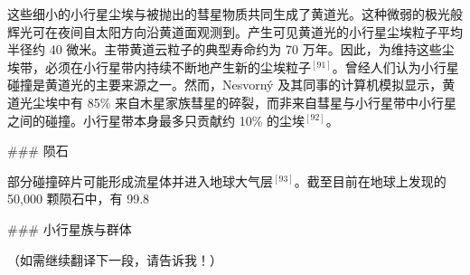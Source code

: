 这些细小的小行星尘埃与被抛出的彗星物质共同生成了黄道光。这种微弱的极光般辉光可在夜间自太阳方向沿黄道面观测到。产生可见黄道光的小行星尘埃粒子平均半径约 40 微米。主带黄道云粒子的典型寿命约为 70 万年。因此，为维持这些尘埃带，必须在小行星带内持续不断地产生新的尘埃粒子$^{[91]}$。曾经人们认为小行星碰撞是黄道光的主要来源之一。然而，Nesvorný 及其同事的计算机模拟显示，黄道光尘埃中有 85\% 来自木星家族彗星的碎裂，而非来自彗星与小行星带中小行星之间的碰撞。小行星带本身最多只贡献约 10\% 的尘埃$^{[92]}$。

### 陨石

部分碰撞碎片可能形成流星体并进入地球大气层$^{[93]}$。截至目前在地球上发现的 50,000 颗陨石中，有 99.8%

### 小行星族与群体

（如需继续翻译下一段，请告诉我！）
